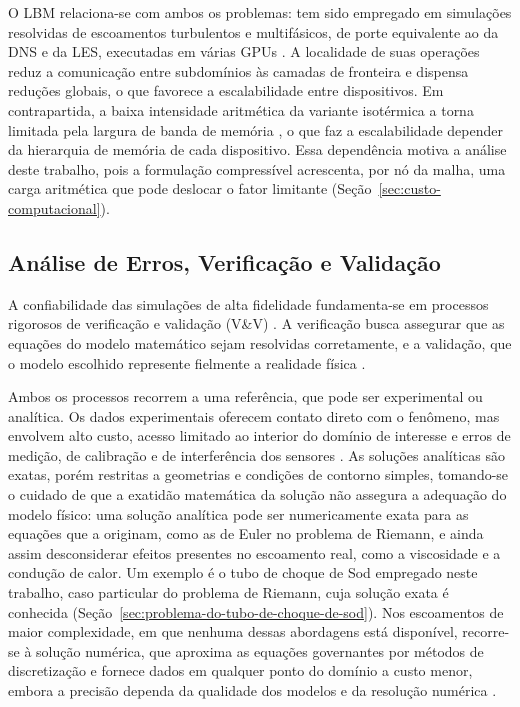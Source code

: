 O LBM relaciona-se com ambos os problemas: tem sido empregado em simulações resolvidas de escoamentos turbulentos e multifásicos, de porte equivalente ao da DNS e da LES, executadas em várias GPUs \parencite{Lauricella2025}.
A localidade de suas operações reduz a comunicação entre subdomínios às camadas de fronteira e dispensa reduções globais, o que favorece a escalabilidade entre dispositivos.
Em contrapartida, a baixa intensidade aritmética da variante isotérmica a torna limitada pela largura de banda de memória \parencite{Tomczak2021, Ma2023}, o que faz a escalabilidade depender da hierarquia de memória de cada dispositivo.
Essa dependência motiva a análise deste trabalho, pois a formulação compressível acrescenta, por nó da malha, uma carga aritmética que pode deslocar o fator limitante (Seção~\ref{sec:custo-computacional}).


\subsection{Análise de Erros, Verificação e Validação}\label{subsec:erros-verificacao-validacao}

A confiabilidade das simulações de alta fidelidade fundamenta-se em processos rigorosos de verificação e validação (V\&V) \parencite{Roache1998, Oberkampf2010}.
A verificação busca assegurar que as equações do modelo matemático sejam resolvidas corretamente, e a validação, que o modelo escolhido represente fielmente a realidade física \parencite{AIAA1998, ASME2009}.

Ambos os processos recorrem a uma referência, que pode ser experimental ou analítica.
Os dados experimentais oferecem contato direto com o fenômeno, mas envolvem alto custo, acesso limitado ao interior do domínio de interesse e erros de medição, de calibração e de interferência dos sensores \parencite{Stern2001}.
As soluções analíticas são exatas, porém restritas a geometrias e condições de contorno simples, tomando-se o cuidado de que a exatidão matemática da solução não assegura a adequação do modelo físico: uma solução analítica pode ser numericamente exata para as equações que a originam, como as de Euler no problema de Riemann, e ainda assim desconsiderar efeitos presentes no escoamento real, como a viscosidade e a condução de calor.
Um exemplo é o tubo de choque de Sod empregado neste trabalho, caso particular do problema de Riemann, cuja solução exata é conhecida (Seção~\ref{sec:problema-do-tubo-de-choque-de-sod}).
Nos escoamentos de maior complexidade, em que nenhuma dessas abordagens está disponível, recorre-se à solução numérica, que aproxima as equações governantes por métodos de discretização e fornece dados em qualquer ponto do domínio a custo menor, embora a precisão dependa da qualidade dos modelos e da resolução numérica \parencite{Oberkampf2010}.

